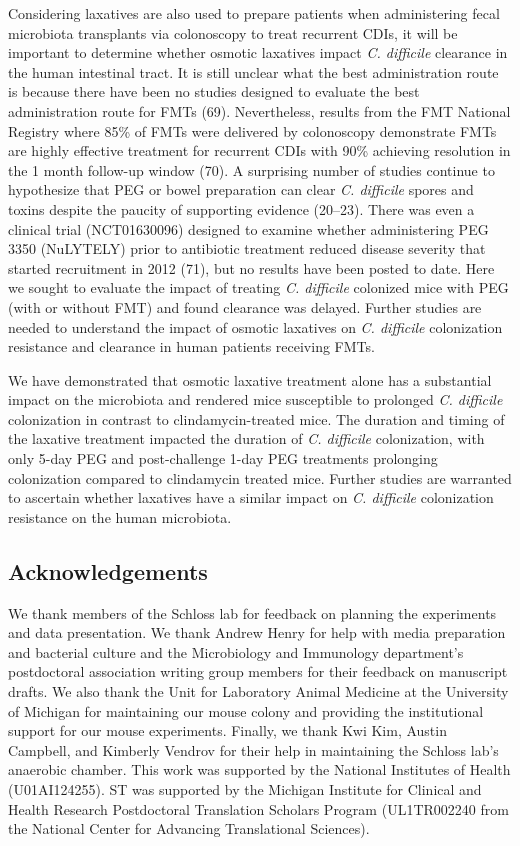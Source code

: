 \documentclass[
  11pt,
]{article}
\begin{document}
Considering laxatives are also used to prepare patients when
administering fecal microbiota transplants via colonoscopy to treat
recurrent CDIs, it will be important to determine whether osmotic
laxatives impact \emph{C. difficile} clearance in the human intestinal
tract. It is still unclear what the best administration route is because
there have been no studies designed to evaluate the best administration
route for FMTs (69). Nevertheless, results from the FMT National
Registry where 85\% of FMTs were delivered by colonoscopy demonstrate
FMTs are highly effective treatment for recurrent CDIs with 90\%
achieving resolution in the 1 month follow-up window (70). A surprising
number of studies continue to hypothesize that PEG or bowel preparation
can clear \emph{C. difficile} spores and toxins despite the paucity of
supporting evidence (20--23). There was even a clinical trial
(NCT01630096) designed to examine whether administering PEG 3350
(NuLYTELY) prior to antibiotic treatment reduced disease severity that
started recruitment in 2012 (71), but no results have been posted to
date. Here we sought to evaluate the impact of treating \emph{C.
difficile} colonized mice with PEG (with or without FMT) and found
clearance was delayed. Further studies are needed to understand the
impact of osmotic laxatives on \emph{C. difficile} colonization
resistance and clearance in human patients receiving FMTs.

We have demonstrated that osmotic laxative treatment alone has a
substantial impact on the microbiota and rendered mice susceptible to
prolonged \emph{C. difficile} colonization in contrast to
clindamycin-treated mice. The duration and timing of the laxative
treatment impacted the duration of \emph{C. difficile} colonization,
with only 5-day PEG and post-challenge 1-day PEG treatments prolonging
colonization compared to clindamycin treated mice. Further studies are
warranted to ascertain whether laxatives have a similar impact on
\emph{C. difficile} colonization resistance on the human microbiota.

\hypertarget{acknowledgements}{%
\subsection{Acknowledgements}\label{acknowledgements}}

We thank members of the Schloss lab for feedback on planning the
experiments and data presentation. We thank Andrew Henry for help with
media preparation and bacterial culture and the Microbiology and
Immunology department's postdoctoral association writing group members
for their feedback on manuscript drafts. We also thank the Unit for
Laboratory Animal Medicine at the University of Michigan for maintaining
our mouse colony and providing the institutional support for our mouse
experiments. Finally, we thank Kwi Kim, Austin Campbell, and Kimberly
Vendrov for their help in maintaining the Schloss lab's anaerobic
chamber. This work was supported by the National Institutes of Health
(U01AI124255). ST was supported by the Michigan Institute for Clinical
and Health Research Postdoctoral Translation Scholars Program
(UL1TR002240 from the National Center for Advancing Translational
Sciences).
\end{document}
